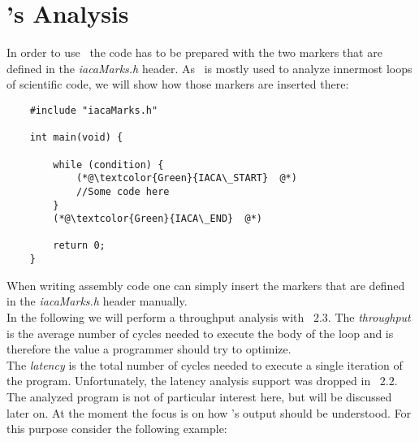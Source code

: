\section{\iaca's Analysis} 

In order to use \iaca\ the code has to be prepared with the two markers that are defined in the \emph{iacaMarks.h} header. As \iaca\ is mostly used to analyze innermost loops of scientific code, we will show how those markers are inserted there:

\begin{mdframed}[backgroundcolor=light-gray, roundcorner=10pt,leftmargin=1, rightmargin=1, innerleftmargin=15, innertopmargin=1,innerbottommargin=1, outerlinewidth=1, linecolor=light-gray]
    \begin{lstlisting}
    #include "iacaMarks.h"
    
    int main(void) {
    
        while (condition) {
            (*@\textcolor{Green}{IACA\_START}  @*)
            //Some code here
        }
        (*@\textcolor{Green}{IACA\_END}  @*)
    
        return 0;
    }
    \end{lstlisting}
\end{mdframed}

When writing assembly code one can simply insert the markers that are defined in the \emph{iacaMarks.h} header manually.\\
In the following we will perform a throughput analysis with \iaca\ $2.3$. The \emph{throughput} is the average number of cycles needed to execute the body of the loop and is therefore the value a programmer should try to optimize.\\ 
The \emph{latency} is the total number of cycles needed to execute a single iteration of the program. Unfortunately, the latency analysis support was dropped in \iaca\ $2.2$.\\
The analyzed program is not of particular interest here, but will be discussed later on. At the moment the focus is on how \iaca's output should be understood. For this purpose consider the following example:

